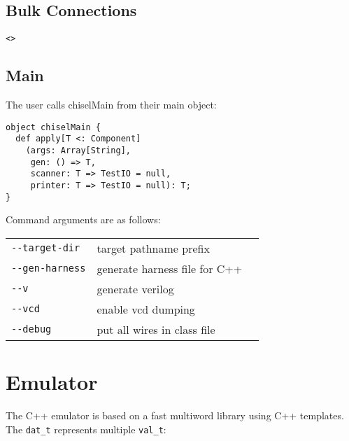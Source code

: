 \documentclass[10pt,twocolumn]{article}
\begin{document}
\subsection{Bulk Connections}

\begin{verbatim}
<>
\end{verbatim}

\subsection{Main}

The user calls chiselMain from their main object:

\begin{verbatim}
object chiselMain {
  def apply[T <: Component]
    (args: Array[String], 
     gen: () => T, 
     scanner: T => TestIO = null, 
     printer: T => TestIO = null): T;
}
\end{verbatim}

Command arguments are as follows:
\begin{tabular}{lll}
\verb+--target-dir+ & target pathname prefix \\
\verb+--gen-harness+ & generate harness file for C++ \\
\verb+--v+ & generate verilog \\
\verb+--vcd+ & enable vcd dumping \\
\verb+--debug+ & put all wires in class file \\
\end{tabular}

\section{Emulator}

The C++ emulator is based on a fast multiword library using
C++ templates.  The \verb+dat_t+ represents multiple \verb+val_t+:
\end{document}
